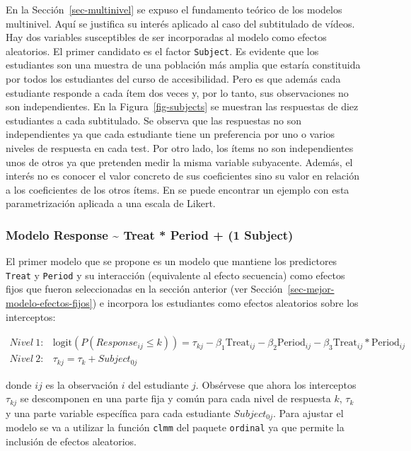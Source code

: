 \documentclass[
  12pt,
  a4paper,
  extrafontsizes,
  onecolumn,
  openright,
  table]{memoir}
\begin{document}
En la Sección~\ref{sec-multinivel} se expuso el fundamento teórico de
los modelos multinivel. Aquí se justifica su interés aplicado al caso
del subtitulado de vídeos. Hay dos variables susceptibles de ser
incorporadas al modelo como efectos aleatorios. El primer candidato es
el factor \texttt{Subject}. Es evidente que los estudiantes son una
muestra de una población más amplia que estaría constituida por todos
los estudiantes del curso de accesibilidad. Pero es que además cada
estudiante responde a cada ítem dos veces y, por lo tanto, sus
observaciones no son independientes. En la Figura~\ref{fig-subjects} se
muestran las respuestas de diez estudiantes a cada subtitulado. Se
observa que las respuestas no son independientes ya que cada estudiante
tiene un preferencia por uno o varios niveles de respuesta en cada test.
Por otro lado, los ítems no son independientes unos de otros ya que
pretenden medir la misma variable subyacente. Además, el interés no es
conocer el valor concreto de sus coeficientes sino su valor en relación
a los coeficientes de los otros ítems. En
\textcite[pp.~14-16]{burkner2021} \textcite[pp.~19-20]{burkner2019} se
puede encontrar un ejemplo con esta parametrización aplicada a una
escala de Likert.

\hypertarget{modelo-response-treat-period-1-subject}{%
\subsubsection{Modelo Response \textasciitilde{} Treat * Period + (1
\textbar{} Subject)}\label{modelo-response-treat-period-1-subject}}

El primer modelo que se propone es un modelo que mantiene los
predictores \texttt{Treat} y \texttt{Period} y su interacción
(equivalente al efecto secuencia) como efectos fijos que fueron
seleccionadas en la sección anterior (ver
Sección~\ref{sec-mejor-modelo-efectos-fijos}) e incorpora los
estudiantes como efectos aleatorios sobre los interceptos:

\small

\[
\begin{aligned}
Nivel\ 1: & \text{logit}(P(Response_{ij} \leq k)) = \tau_{kj} - \beta_1 \text{Treat}_{ij} - \beta_2 \text{Period}_{ij} - \beta_3 \text{Treat}_{ij} * \text{Period}_{ij} \\
Nivel\ 2: & \tau_{kj}  =  \tau_{k} + Subject_{0j}
\end{aligned}
\]

\normalsize

donde \(ij\) es la observación \(i\) del estudiante \(j\). Obsérvese que
ahora los interceptos \(\tau_{kj}\) se descomponen en una parte fija y
común para cada nivel de respuesta \(k\), \(\tau_{k}\) y una parte
variable específica para cada estudiante \(Subject_{0j}\). Para ajustar
el modelo se va a utilizar la función \texttt{clmm} del paquete
\texttt{ordinal} \autocite[ver][]{ordinal} ya que permite la inclusión
de efectos aleatorios.
\end{document}
